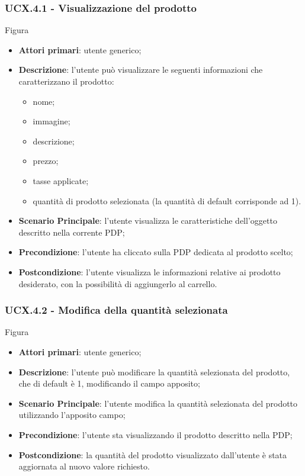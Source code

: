 \subsubsection{UCX.4.1 - Visualizzazione del prodotto}
Figura \\
\begin{itemize}
\item \textbf{Attori primari}: utente generico;
\item \textbf{Descrizione}: l'utente può visualizzare le seguenti informazioni che caratterizzano il prodotto:
\begin{itemize}
\item nome;
\item immagine;
\item descrizione;
\item prezzo;
\item tasse applicate;
\item quantità di prodotto selezionata (la quantità di default corrisponde ad 1).
\end{itemize}
\item \textbf{Scenario Principale}: l'utente visualizza le caratteristiche dell'oggetto descritto nella corrente PDP;
\item \textbf{Precondizione}: l'utente ha cliccato sulla PDP dedicata al prodotto scelto;
\item \textbf{Postcondizione}: l'utente visualizza le informazioni relative ai prodotto desiderato, con la possibilità di aggiungerlo al carrello.
\end{itemize}
\subsubsection{UCX.4.2 - Modifica della quantità selezionata}
Figura \\
\begin{itemize}
\item \textbf{Attori primari}: utente generico;
\item \textbf{Descrizione}: l'utente può modificare la quantità selezionata del prodotto, che di default è 1, modificando il campo apposito;
\item \textbf{Scenario Principale}: l'utente modifica la quantità selezionata del prodotto utilizzando l'apposito campo;
\item \textbf{Precondizione}: l'utente sta visualizzando il prodotto descritto nella PDP;
\item \textbf{Postcondizione}: la quantità del prodotto visualizzato dall'utente è stata aggiornata al nuovo valore richiesto.
\end{itemize}
